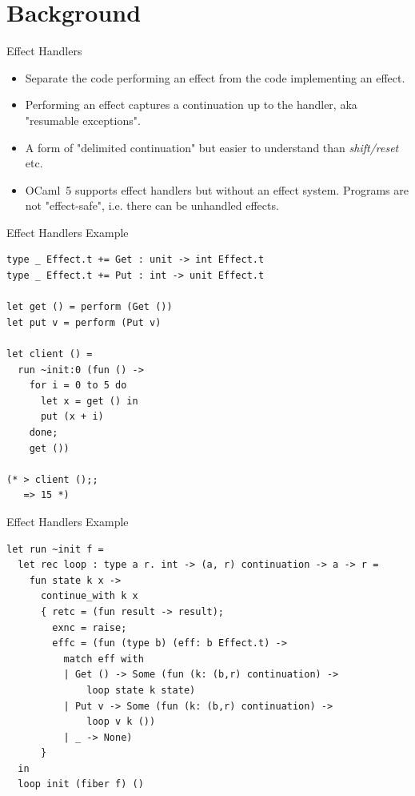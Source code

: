 \documentclass[aspectratio=43]{beamer}
\newcommand{\ocf}{OCaml~5}
\begin{document}
\section{Background}

\begin{frame}[fragile]{Effect Handlers}
    \begin{itemize}
        \item Separate the code performing an effect from the code implementing an effect.
        \item Performing an effect captures a continuation up to the handler, aka "resumable exceptions".
        \item A form of "delimited continuation" but easier to understand than \textit{shift/reset} etc.
        \item \ocf{} supports effect handlers but without an effect system. Programs are not "effect-safe", i.e. there can be unhandled effects.
    \end{itemize}
\end{frame}


\begin{frame}[fragile]{Effect Handlers Example}
    \begin{verbatim}
type _ Effect.t += Get : unit -> int Effect.t
type _ Effect.t += Put : int -> unit Effect.t

let get () = perform (Get ())
let put v = perform (Put v)

let client () = 
  run ~init:0 (fun () ->
    for i = 0 to 5 do
      let x = get () in
      put (x + i)
    done;
    get ())

(* > client ();;
   => 15 *)
\end{verbatim}
\end{frame}

\begin{frame}[fragile]{Effect Handlers Example}
    \begin{verbatim}
let run ~init f =
  let rec loop : type a r. int -> (a, r) continuation -> a -> r =
    fun state k x ->
      continue_with k x
      { retc = (fun result -> result);
        exnc = raise;
        effc = (fun (type b) (eff: b Effect.t) ->
          match eff with
          | Get () -> Some (fun (k: (b,r) continuation) ->
              loop state k state)
          | Put v -> Some (fun (k: (b,r) continuation) ->
              loop v k ())
          | _ -> None)
      }
  in
  loop init (fiber f) ()
\end{verbatim}
\end{frame}
\end{document}
